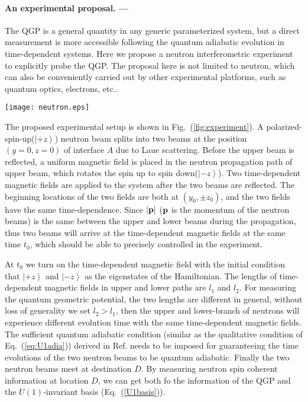 \documentclass[aps,pra,twocolumn,
groupedaddress,10pt]{revtex4}
\begin{document}
\paragraph*{An experimental proposal. ---}
The QGP is a general quantity in any generic parameterized system,
but a direct measurement is more accessible following the quantum adiabatic evolution
in time-dependent systems.
Here we propose a
neutron interferometric experiment to explicitly probe the QGP.
The proposal here is not limited to neutron, which can also
be conveniently carried out by other experimental platforms,
such as quantum optics, electrons, etc..

\begin{figure*}[t]
\begin{center}
\texttt{[image: neutron.eps]}
\end{center}
\caption{Schematic experimental setup for measuring the QGP.}
\label{fig:experiment}
\end{figure*}
The proposed experimental setup is shown in Fig.~(\ref{fig:experiment}).
A polarized-spin-up($\left| { + z} \right\rangle$) neutron beam splits
into two beams at the position $(y=0,z=0)$ of interface $A$  due to Laue scattering.
Before the upper beam is reflected, a uniform magnetic field
is placed in the neutron propagation path
of upper beam, which rotates
the spin up to spin down($\left| { - z} \right\rangle$).
Two time-dependent magnetic fields are applied to the system after
the two beams are reflected. The beginning locations of the two fields
are both at $(y_0, \pm z_0)$, and the two fields have the same
time-dependence.
Since $|{\bf p}|$ (${\bf p}$ is the momentum of the neutron beams)
is the same between the upper and lower beams during
the propagation, thus two beams will arrive at the
time-dependent magnetic fields at the same time $t_0$, which should
be able to precisely controlled in the experiment.

At $t_0$ we turn on
the time-dependent magnetic field with the initial condition that
$\left| { + z} \right\rangle$ and $\left| { - z} \right\rangle$ as
the eigenstates of the Hamiltonian. The lengths of time-dependent
magnetic fields in upper and lower paths are $l_1$ and $l_2$.
For measuring the quantum geometric potential, the two lengths are different in general,
without loss of generality we set $l_2>l_1$, then
the upper and lower-branch of neutrons
will experience different evolution time with the same time-dependent magnetic fields.
The sufficient quantum adiabatic condition (similar as
the qualitative condition of Eq.~(\ref{eq:U1adia}))
derived in Ref.\cite{Jianda2008} needs to be imposed for
guaranteeing the time evolutions of the two neutron beams to be quantum adiabatic.
Finally the two neutron beams meet at destination $D$.
By measuring neutron spin coherent information at location $D$,
we can get both fo the information of the QGP and the $U(1)$-invariant basis (Eq.~(\ref{U1basis})).
\end{document}
